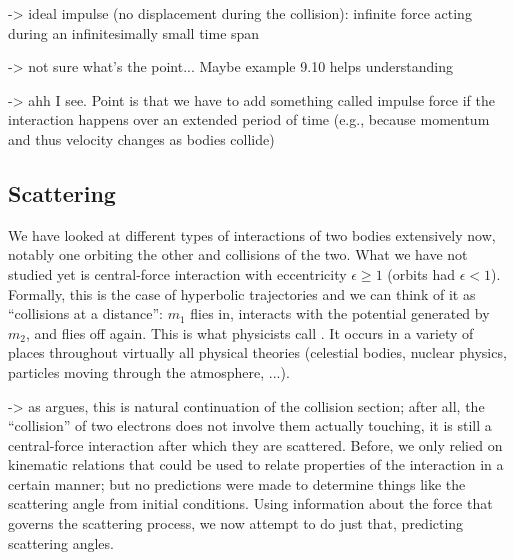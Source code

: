 \documentclass[../class_mech_main.tex]{subfiles}
\begin{document}
-> ideal impulse (no displacement during the collision): infinite force acting during an infinitesimally small time span


-> not sure what's the point... Maybe example 9.10 helps understanding

-> ahh I see. Point is that we have to add something called impulse force if the interaction happens over an extended period of time (e.g., because momentum and thus velocity changes as bodies collide)



		\subsection{Scattering}
We have looked at different types of interactions of two bodies extensively now, notably one orbiting the other and collisions of the two. What we have not studied yet is central-force interaction with eccentricity $\epsilon \geq 1$ (orbits had $\epsilon < 1$). Formally, this is the case of hyperbolic trajectories and we can think of it as \enquote{collisions at a distance}: $m_1$ flies in, interacts with the potential generated by $m_2$, and flies off again. This is what physicists call . It occurs in a variety of places throughout virtually all physical theories (celestial bodies, nuclear physics, particles moving through the atmosphere, ...). %




-> as \cite{Thornton_2003} argues, this is natural continuation of the collision section; after all, the \enquote{collision} of two electrons does not involve them actually touching, it is still a central-force interaction after which they are scattered. Before, we only relied on kinematic relations that could be used to relate properties of the interaction in a certain manner; but no predictions were made to determine things like the scattering angle from initial conditions. Using information about the force that governs the scattering process, we now attempt to do just that, predicting scattering angles.
\end{document}
